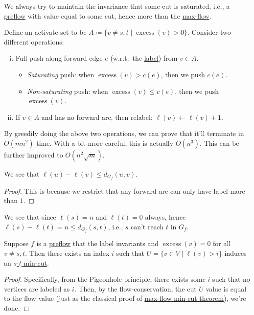 \begin{intuition}
	We always try to maintain the invariance that some cut is saturated, i.e., a \hyperref[def:preflow]{preflow} with value equal to some cut, hence more than the \hyperref[prb:s-t-max-flow]{max-flow}.
\end{intuition}

Define an activate set to be \(A \coloneqq \{ v \neq s, t \mid \operatorname{excess}(v) > 0 \} \). Consider two different operations:
\begin{enumerate}[(i)]
	\item Full push along forward edge \(e\) (w.r.t.\ the \hyperref[def:label]{label}) from \(v \in A\).
	      \begin{itemize}
		      \item \emph{Saturating} push: when \(\operatorname{excess}(v) > c(e)\), then we push \(c(e)\).
		      \item \emph{Non-saturating} push: when \(\operatorname{excess}(v) \leq c(e)\), then we push \(\operatorname{excess}(v)\).
	      \end{itemize}
	\item If \(v \in A\) and has no forward arc, then relabel: \(\ell (v) \gets \ell (v) + 1\).
\end{enumerate}

By greedily doing the above two operations, we can prove that it'll terminate in \(O(mn^2)\) time. With a bit more careful, this is actually \(O(n^3)\). This can be further improved to \(O(n^2 \sqrt{m} )\).

\begin{lemma}\label{lma:push-relabel-distance}
	We see that \(\ell (u) - \ell (v) \leq d_{G_f}(u, v)\).
\end{lemma}
\begin{proof}
	This is because we restrict that any forward arc can only have label more than \(1\).
\end{proof}

We see that since \(\ell (s) = n\) and \(\ell (t) = 0\) always, hence \(\ell (s) - \ell (t) = n \leq d_{G_f}(s, t)\), i.e., \(s\) can't reach \(t\) in \(G_f\).

\begin{lemma}\label{lma:push-relabel-cut}
	Suppose \(f\) is a \hyperref[def:preflow]{preflow} that the label invariants and \(\operatorname{excess}(v) = 0\) for all \(v \neq s, t\). Then there exists an index \(i\) such that \(U = \{ v \in V \mid \ell (v) > i \} \) induces an \hyperref[prb:s-t-min-cut]{\(s\)-\(t\) min-cut}.
\end{lemma}
\begin{proof}
	Specifically, from the Pigeonhole principle, there exists some \(i\) such that no vertices are labeled as \(i\). Then, by the flow-conservation, the cut \(U\) value is equal to the flow value (just as the classical proof of \hyperref[thm:max-flow-min-cut]{max-flow min-cut theorem}), we're done.
\end{proof}

